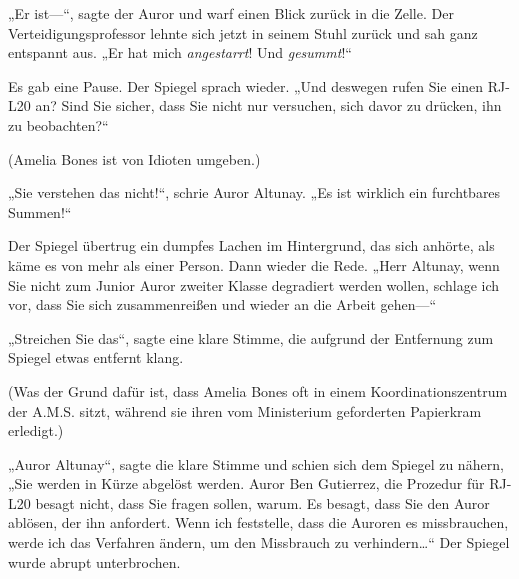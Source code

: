 „Er ist—“, sagte der Auror und warf einen Blick zurück in die Zelle. Der Verteidigungsprofessor lehnte sich jetzt in seinem Stuhl zurück und sah ganz entspannt aus. „Er hat mich \emph{angestarrt}! Und \emph{gesummt}!“


Es gab eine Pause. Der Spiegel sprach wieder.
„Und deswegen rufen Sie einen RJ-L20 an? Sind Sie sicher, dass Sie nicht nur versuchen, sich davor zu drücken, ihn zu beobachten?“

(Amelia Bones ist von Idioten umgeben.)

„Sie verstehen das nicht!“, schrie Auror Altunay. „Es ist wirklich ein furchtbares Summen!“

Der Spiegel übertrug ein dumpfes Lachen im Hintergrund, das sich anhörte, als käme es von mehr als einer Person. Dann wieder die Rede.
„Herr Altunay, wenn Sie nicht zum Junior Auror zweiter Klasse degradiert werden wollen, schlage ich vor, dass Sie sich zusammenreißen und wieder an die Arbeit gehen—“

„Streichen Sie das“, sagte eine klare Stimme, die aufgrund der Entfernung zum Spiegel etwas entfernt klang.

(Was der Grund dafür ist, dass Amelia Bones oft in einem Koordinationszentrum der A.M.S. sitzt, während sie ihren vom Ministerium geforderten Papierkram erledigt.)

„Auror Altunay“, sagte die klare Stimme und schien sich dem Spiegel zu nähern, „Sie werden in Kürze abgelöst werden. Auror Ben Gutierrez, die Prozedur für RJ-L20 besagt nicht, dass Sie fragen sollen, warum. Es besagt, dass Sie den Auror ablösen, der ihn anfordert. Wenn ich feststelle, dass die Auroren es missbrauchen, werde ich das Verfahren ändern, um den Missbrauch zu verhindern…“
Der Spiegel wurde abrupt unterbrochen.

